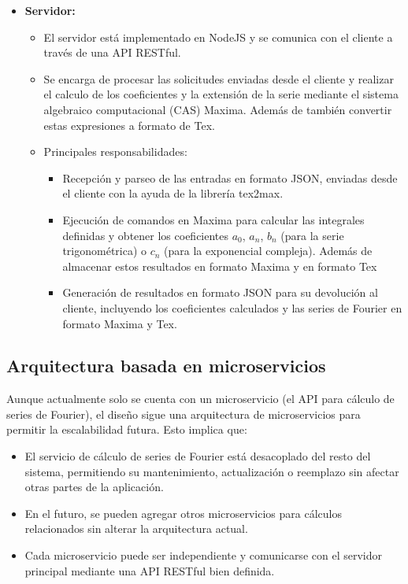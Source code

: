 \begin{itemize}
	\item \textbf{Servidor:}
	\begin{itemize}
		\item El servidor está implementado en NodeJS y se comunica con el cliente a través de una API RESTful.
		\item Se encarga de procesar las solicitudes enviadas desde el cliente y realizar  el calculo de los coeficientes y la extensión de la serie mediante el sistema algebraico computacional (CAS) Maxima. Además de también convertir estas expresiones a formato de Tex.
		\item Principales responsabilidades:
		\begin{itemize}
			\item Recepción y parseo de las entradas en formato JSON, enviadas desde el cliente con la ayuda de la librería tex2max.
			\item Ejecución de comandos en Maxima para calcular las integrales definidas y obtener los coeficientes \( a_0 \), \( a_n \), \( b_n \) (para la serie trigonométrica) o \( c_n \) (para la exponencial compleja). Además de almacenar estos resultados en formato Maxima y en formato Tex
			\item Generación de resultados en formato JSON para su devolución al cliente, incluyendo los coeficientes calculados y las series de Fourier en formato Maxima y Tex.
			
		\end{itemize}
	\end{itemize}
\end{itemize}
\subsection{Arquitectura basada en microservicios}
Aunque actualmente solo se cuenta con un microservicio (el API para cálculo de series de Fourier), el diseño sigue una arquitectura de microservicios para permitir la escalabilidad futura. Esto implica que:

\begin{itemize}
	\item El servicio de cálculo de series de Fourier está desacoplado del resto del sistema, permitiendo su mantenimiento, actualización o reemplazo sin afectar otras partes de la aplicación.
	\item En el futuro, se pueden agregar otros microservicios para cálculos relacionados sin alterar la arquitectura actual.
	\item Cada microservicio puede ser independiente y comunicarse con el servidor principal mediante una API RESTful bien definida.
\end{itemize}

